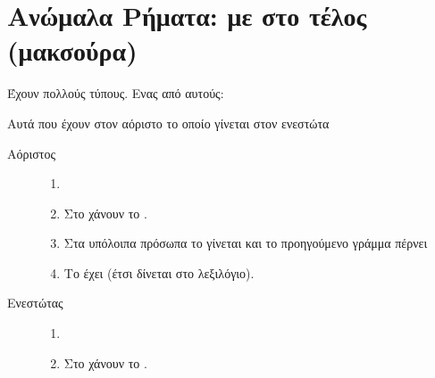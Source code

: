 \section*{Ανώμαλα Ρήματα: με  στο τέλος (μακσούρα)}

Έχουν πολλούς τύπους. Ενας από αυτούς:

Αυτά που έχουν  στον αόριστο το οποίο γίνεται  στον ενεστώτα

\begin{description}
\item[Αόριστος]

	\begin{enumerate}
	\item[]
	\item Στο  χάνουν το .
	\item Στα υπόλοιπα πρόσωπα το  γίνεται  και το προηγούμενο γράμμα πέρνει 
	\item Το  έχει  (έτσι δίνεται στο λεξιλόγιο).
	\end{enumerate}

\item[Ενεστώτας]

	\begin{enumerate}
	\item[]
	\item Στο  χάνουν το .
	\end{enumerate}

\end{description}

